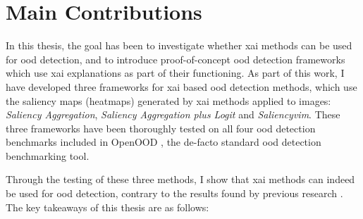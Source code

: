 \documentclass[UKenglish]{uiomasterthesis} %
\theoremstyle{definition}
\begin{document}
\section{Main Contributions}

In this thesis, the goal has been to investigate whether \ac{xai} methods can be used for \ac{ood} detection, and to introduce proof-of-concept \ac{ood} detection frameworks which use \ac{xai} explanations as part of their functioning. As part of this work, I have developed three frameworks for \ac{xai} based \ac{ood} detection methods, which use the saliency maps (heatmaps) generated by \ac{xai} methods applied to images: {\it Saliency Aggregation}, {\it Saliency Aggregation plus Logit} and {\it Saliency\acs*{vim}}. These three frameworks have been thoroughly tested on all four \ac{ood} detection benchmarks included in OpenOOD \cite{openood, openood15}, the de-facto standard \ac{ood} detection benchmarking tool.

Through the testing of these three methods, I show that \ac{xai} methods can indeed be used for \ac{ood} detection, contrary to the results found by previous research \cite{martinez}. The key takeaways of this thesis are as follows:
\end{document}
